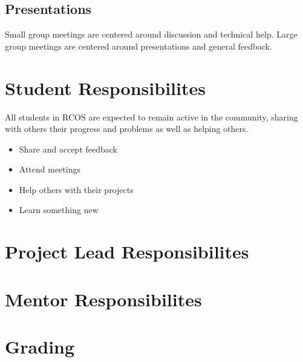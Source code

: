 \documentclass[12pt]{article}
\begin{document}
    \subsection{Presentations}

    Small group meetings are centered around discussion and technical help. Large group meetings are centered around presentations and general feedback.


    \section{Student Responsibilites}

    All students in RCOS are expected to remain active in the community, sharing with others their progress and problems as well as helping others.

    \begin{itemize}
        \item Share and accept feedback
        \item Attend meetings
        \item Help others with their projects
        \item Learn something new
    \end{itemize}

    \section{Project Lead Responsibilites}


    \section{Mentor Responsibilites}


    \section{Grading}

\end{document}
